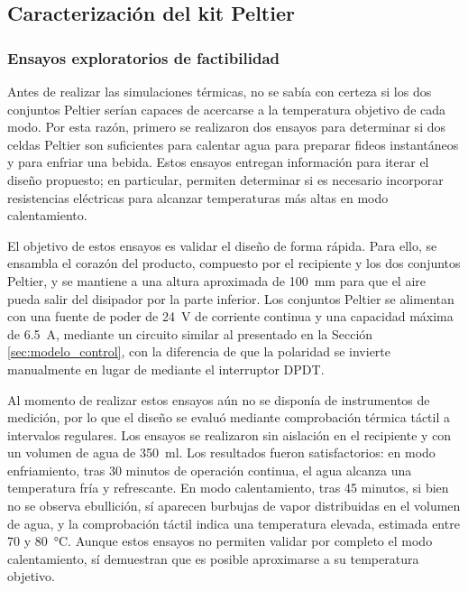 \documentclass[12pt, a4paper]{article}
\begin{document}
\subsection{Caracterización del kit Peltier}

\subsubsection{Ensayos exploratorios de factibilidad}

Antes de realizar las simulaciones térmicas, no se sabía con certeza si los dos conjuntos Peltier serían capaces de acercarse a la temperatura objetivo de cada modo. Por esta razón, primero se realizaron dos ensayos para determinar si dos celdas Peltier son suficientes para calentar agua para preparar fideos instantáneos y para enfriar una bebida. Estos ensayos entregan información para iterar el diseño propuesto; en particular, permiten determinar si es necesario incorporar resistencias eléctricas para alcanzar temperaturas más altas en modo calentamiento.

El objetivo de estos ensayos es validar el diseño de forma rápida. Para ello, se ensambla el corazón del producto, compuesto por el recipiente y los dos conjuntos Peltier, y se mantiene a una altura aproximada de \SI{100}{\mm} para que el aire pueda salir del disipador por la parte inferior. Los conjuntos Peltier se alimentan con una fuente de poder de \SI{24}{\volt} de corriente continua y una capacidad máxima de \SI{6,5}{\ampere}, mediante un circuito similar al presentado en la Sección \ref{sec:modelo_control}, con la diferencia de que la polaridad se invierte manualmente en lugar de mediante el interruptor DPDT.

Al momento de realizar estos ensayos aún no se disponía de instrumentos de medición, por lo que el diseño se evaluó mediante comprobación térmica táctil a intervalos regulares. Los ensayos se realizaron sin aislación en el recipiente y con un volumen de agua de \SI{350}{\ml}. Los resultados fueron satisfactorios: en modo enfriamiento, tras 30 minutos de operación continua, el agua alcanza una temperatura fría y refrescante. En modo calentamiento, tras 45 minutos, si bien no se observa ebullición, sí aparecen burbujas de vapor distribuidas en el volumen de agua, y la comprobación táctil indica una temperatura elevada, estimada entre 70 y \SI{80}{\celsius}. Aunque estos ensayos no permiten validar por completo el modo calentamiento, sí demuestran que es posible aproximarse a su temperatura objetivo.
\end{document}
